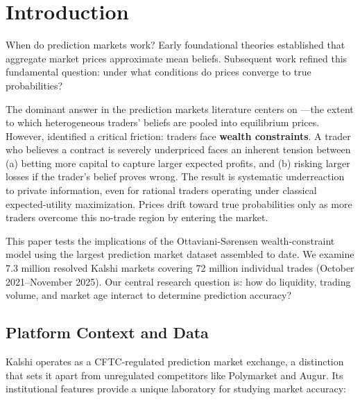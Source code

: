 \section{Introduction}
\label{sec:intro}

When do prediction markets work? Early foundational theories \citep{Wolfers2004,Wolfers2006} established that aggregate market prices approximate mean beliefs. Subsequent work \citep{Ottaviani2007,Ottaviani2010a,Ottaviani2010b,Page2013} refined this fundamental question: under what conditions do prices converge to true probabilities?

The dominant answer in the prediction markets literature centers on ---the extent to which heterogeneous traders' beliefs are pooled into equilibrium prices. However, \citet{Ottaviani2007} identified a critical friction: traders face \textbf{wealth constraints}. A trader who believes a contract is severely underpriced faces an inherent tension between (a) betting more capital to capture larger expected profits, and (b) risking larger losses if the trader's belief proves wrong. The result is systematic underreaction to private information, even for rational traders operating under classical expected-utility maximization. Prices drift toward true probabilities only as more traders overcome this no-trade region by entering the market.

This paper tests the implications of the Ottaviani-Sørensen wealth-constraint model using the largest prediction market dataset assembled to date. We examine 7.3 million resolved Kalshi markets covering 72 million individual trades (October 2021--November 2025). Our central research question is: how do liquidity, trading volume, and market age interact to determine prediction accuracy?

\subsection{Platform Context and Data}
\label{subsec:platform}

Kalshi operates as a CFTC-regulated prediction market exchange, a distinction that sets it apart from unregulated competitors like Polymarket and Augur. Its institutional features provide a unique laboratory for studying market accuracy:

